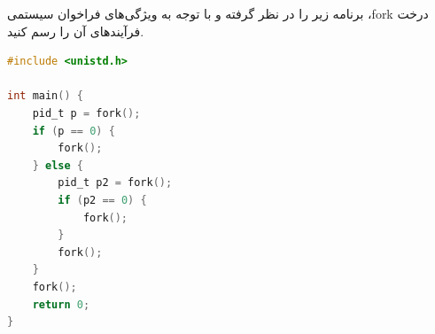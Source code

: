 \question[20] برنامه زیر را در نظر گرفته و با توجه به ویژگی‌های فراخوان سیستمی ،fork
درخت فرآیند‌های آن را رسم کنید.
\begin{latin}
    \begin{lstlisting}[language=C]
#include <unistd.h>

int main() {
    pid_t p = fork();
    if (p == 0) {
        fork();
    } else {
        pid_t p2 = fork();
        if (p2 == 0) {
            fork();
        }
        fork();
    }
    fork();
    return 0;
}
\end{lstlisting}
\end{latin}